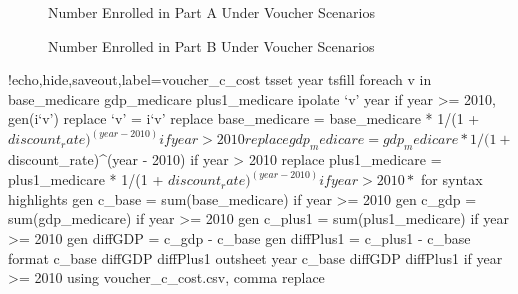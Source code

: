\documentclass{article}
\begin{document}
\begin{figure}[ht]
\centering
{}
\caption{Number Enrolled in Part A Under Voucher Scenarios}
\label{fig:voucher_enroll}
\end{figure}

\begin{figure}[ht]
\centering
{}
\caption{Number Enrolled in Part B Under Voucher Scenarios}
\label{fig:voucher_enroll}
\end{figure}


\begin{Statacode}{!echo,hide,saveout,label=voucher_c_cost}
tsset year
tsfill
foreach v in base_medicare gdp_medicare plus1_medicare {
  ipolate `v' year if year >= 2010, gen(i`v')
  replace `v' = i`v'
}
replace base_medicare = base_medicare * 1/(1 + $discount_rate)^(year - 2010) if year > 2010
replace gdp_medicare = gdp_medicare * 1/(1 + $discount_rate)^(year - 2010) if year > 2010
replace plus1_medicare = plus1_medicare * 1/(1 + $discount_rate)^(year - 2010) if year > 2010
* $ for syntax highlights
gen c_base = sum(base_medicare) if year >= 2010
gen c_gdp = sum(gdp_medicare) if year >= 2010
gen c_plus1 = sum(plus1_medicare) if year >= 2010
gen diffGDP = c_gdp - c_base
gen diffPlus1 = c_plus1 - c_base
format c_base diffGDP diffPlus1 %
outsheet year c_base diffGDP diffPlus1 if year >= 2010 using voucher_c_cost.csv, comma replace
\end{Statacode}

\begin{table}[ht]
\centering
\caption{Net Present Value of Voucher Programs Less Net Present Value of ACA (Billions 2010 Dollars)}
\label{tab:voucher_c_cost}
\end{table}
\end{document}
